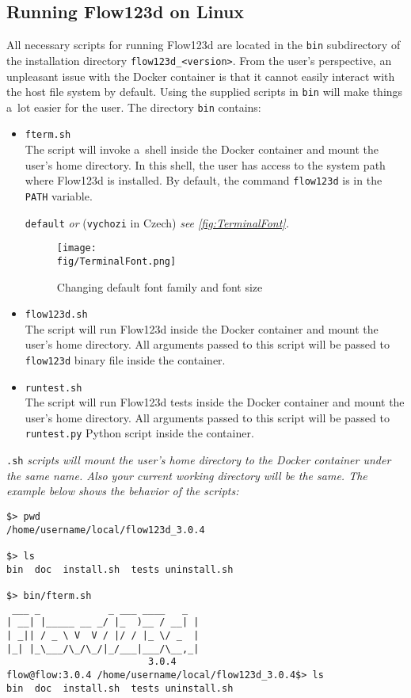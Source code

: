 \subsection{Running Flow123d on Linux}
\label{subsec:running-flow123d-on-linux}
All necessary scripts for running Flow123d are located in the \verb'bin' subdirectory of the installation directory \verb'flow123d_<version>'.
From the user's perspective, an unpleasant issue with the Docker container is that it cannot easily interact with the host file system by default.
Using the supplied scripts in \verb'bin' will make things a~lot easier for the user.
The directory \verb'bin' contains:
\begin{itemize}
	\item \verb'fterm.sh' \\
	 The script will invoke a~shell inside the Docker container and mount the user's home directory.
	 In this shell, the user has access to the system path where Flow123d is installed.
	 By default, the command \verb'flow123d' is in the \verb'PATH' variable.
	 
	\verb'default' \emph{or} (\verb'vychozi' in Czech) \emph{see \autoref{fig:TerminalFont}.}
	 \begin{figure}
		 \center
		 \texttt{[image: \\fig/TerminalFont.png]}
		 \caption{Changing default font family and font size}
		 \label{fig:TerminalFont}
	 \end{figure}

	\item \verb'flow123d.sh' \\
	 The script will run Flow123d inside the Docker container and mount the user's home directory.
	 All arguments passed to this script will be passed to \verb'flow123d' binary file inside the container.

	\item \verb'runtest.sh' \\
	 The script will run Flow123d tests inside the Docker container and mount the user's home directory.
	 All arguments passed to this script will be passed to \verb'runtest.py' Python script inside the container.
\end{itemize}

 \verb'.sh'
\emph{scripts will mount the user's home directory to the Docker container under the same name.
Also your current working directory will be the same. The example below shows the behavior of the scripts:}
\begin{verbatim}
$> pwd
/home/username/local/flow123d_3.0.4

$> ls
bin  doc  install.sh  tests uninstall.sh

$> bin/fterm.sh
 ___ _            _ ___ ____   _
| __| |_____ __ _/ |_  )__ / __| |
| _|| / _ \ V  V / |/ / |_ \/ _  |
|_| |_\___/\_/\_/|_/___|___/\__,_|
                         3.0.4
flow@flow:3.0.4 /home/username/local/flow123d_3.0.4$> ls
bin  doc  install.sh  tests uninstall.sh
\end{verbatim}


